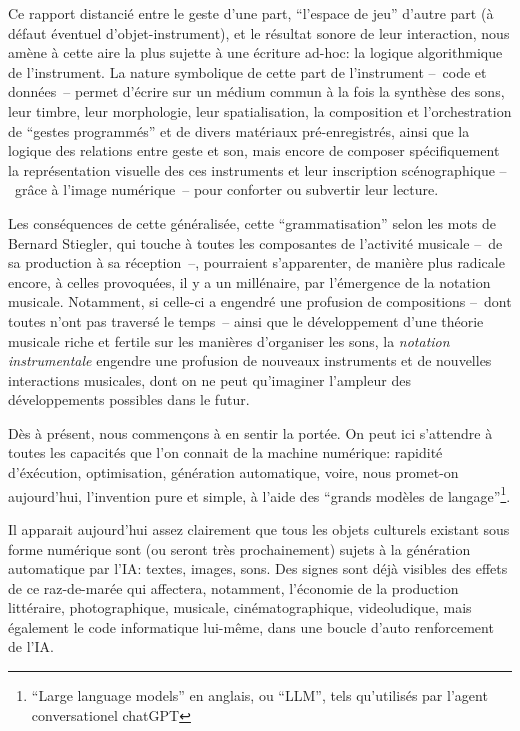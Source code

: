 \indent Ce rapport distancié entre le geste d'une part, ``l'espace de jeu'' d'autre part (à défaut éventuel d'objet-instrument), et le résultat sonore de leur interaction, nous amène à cette aire la plus sujette à une écriture ad-hoc: la logique algorithmique de l'instrument. La nature symbolique de cette part de l'instrument --~code et données~-- permet d'écrire sur un médium commun à la fois la synthèse des sons, leur timbre, leur morphologie, leur spatialisation, la composition et l'orchestration de ``gestes programmés'' et de divers matériaux pré-enregistrés, ainsi que la logique des relations entre geste et son, mais encore de composer spécifiquement la représentation visuelle des ces instruments et leur inscription scénographique --~grâce à l'image numérique~-- pour conforter ou subvertir leur lecture.

\indent Les conséquences de cette  généralisée, cette ``grammatisation'' selon les mots de Bernard Stiegler, qui touche à toutes les composantes de l'activité musicale --~de sa production à sa réception~--, pourraient s'apparenter, de manière plus radicale encore, à celles provoquées, il y a un millénaire, par l'émergence de la notation musicale. Notamment, si celle-ci a engendré une profusion de compositions --~dont toutes n'ont pas traversé le temps~-- ainsi que le développement d'une théorie musicale riche et fertile sur les manières d'organiser les sons, la \textit{notation instrumentale} engendre une profusion de nouveaux instruments et de nouvelles interactions musicales, dont on ne peut qu'imaginer l'ampleur des développements possibles dans le futur.


\indent Dès à présent, nous commençons à en sentir la portée. On peut ici s'attendre à toutes les capacités que l'on connait de la machine numérique: rapidité d'éxécution, optimisation, génération automatique, voire, nous promet-on aujourd'hui, l'invention pure et simple, à l'aide des ``grands modèles de langage''\footnote{``Large language models'' en anglais, ou ``LLM'', tels qu'utilisés par l'agent conversationel chatGPT}. 

Il apparait aujourd'hui assez clairement que tous les objets culturels existant sous forme numérique sont (ou seront très prochainement) sujets à la génération automatique par l'IA: textes, images, sons. Des signes sont déjà visibles des effets de ce raz-de-marée qui affectera, notamment, l'économie de la production littéraire, photographique, musicale, cinématographique, videoludique, mais également le code informatique lui-même, dans une boucle d'auto renforcement de l'IA.

